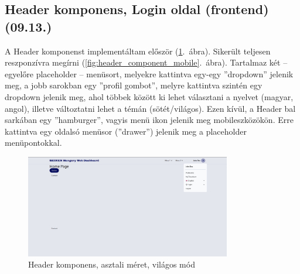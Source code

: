 \documentclass[a4paper]{article}
\begin{document}
\subsection{Header komponens, Login oldal (frontend) (09.13.)}

A Header komponenst implementáltam először (\ref{fig:header_component}.~ábra). Sikerült teljesen
reszponzívra megírni (\ref{fig:header_component_mobile}.~ábra). Tartalmaz
két – egyelőre placeholder – menüsort, melyekre kattintva egy-egy ”dropdown” jelenik meg, a jobb
sarokban egy ”profil gombot”, melyre kattintva szintén egy dropdown jelenik meg, ahol többek között
ki lehet választani a nyelvet (magyar, angol), illetve változtatni lehet a témán (sötét/világos). Ezen
kívül, a Header bal sarkában egy ”hamburger”, vagyis menü ikon jelenik meg mobileszközökön. Erre
kattintva egy oldalsó menüsor (”drawer”) jelenik meg a placeholder menüpontokkal.

\begin{figure}[ht]
  \centering
  \includegraphics[width = 0.8\textwidth]{images/header.png}
  \caption{Header komponens, asztali méret, világos mód}
  \label{fig:header_component}
\end{figure}
\begin{center}
\end{center}
\end{document}
